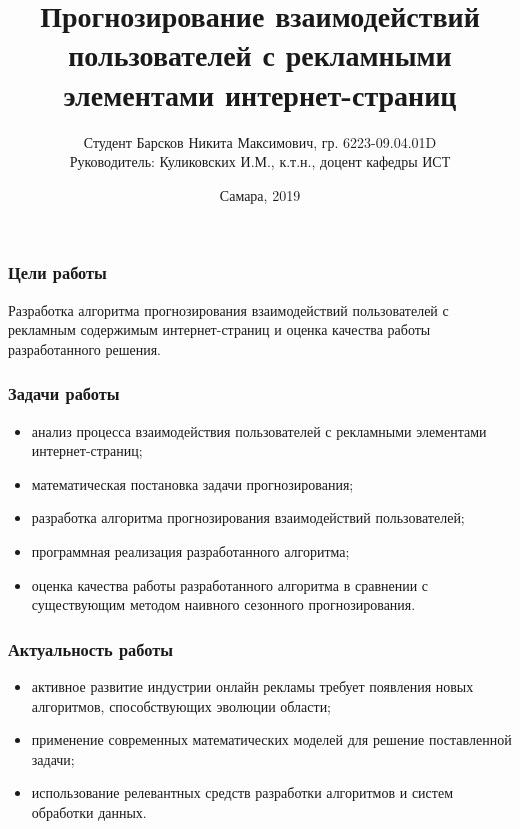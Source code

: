\documentclass[handout]{beamer}
\title{Прогнозирование взаимодействий пользователей с рекламными элементами интернет-страниц}
\author{Студент Барсков Никита Максимович, гр. 6223-09.04.01D \\ Руководитель: Куликовских И.М., к.т.н., доцент кафедры ИСТ}
\date{Самара, 2019}
\begin{document}
\maketitle

\begin{frame}
    \frametitle{Цели работы}
    Разработка алгоритма прогнозирования взаимодействий пользователей с рекламным содержимым интернет-страниц и оценка качества работы разработанного решения.\\
\end{frame}

\begin{frame}
    \frametitle{Задачи работы}
    \begin{itemize}
        \item анализ процесса взаимодействия пользователей с рекламными элементами интернет-страниц; 
        \item математическая постановка задачи прогнозирования; 
        \item разработка алгоритма прогнозирования взаимодействий пользователей; 
        \item программная реализация разработанного алгоритма; 
        \item оценка качества работы разработанного алгоритма в сравнении с существующим методом наивного сезонного прогнозирования. 
    \end{itemize}
\end{frame}

\begin{frame}
    \frametitle{Актуальность работы}
    \begin{itemize}
        \item активное развитие индустрии онлайн рекламы требует появления новых алгоритмов, способствующих эволюции области;
        \item применение современных математических моделей для решение поставленной задачи;
        \item использование релевантных средств разработки алгоритмов и систем обработки данных.
    \end{itemize}
\end{frame}
\end{document}

